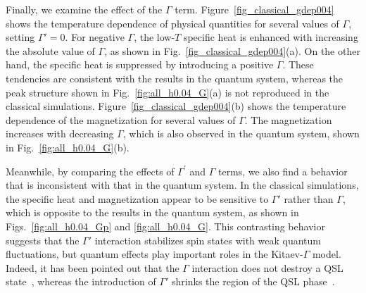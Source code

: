 \documentclass[twocolumn,superscriptaddress,showpacs, longbibliography, aps, prb]{revtex4-2}
\newcommand{\blue}[1]{\textcolor{blue}{#1}}
\newcommand{\orange}[1]{\textcolor{orange}{#1}}
\begin{document}
Finally, we %
examine the effect of the $\Gamma$ term.
Figure~\ref{fig_classical_gdep004} shows the temperature dependence of physical quantities %
for several values of $\Gamma$, %
setting $\Gamma'=0$.
For %
negative $\Gamma$, the low-$T$ specific heat is enhanced with increasing the absolute value of $\Gamma$, as shown in Fig.~\ref{fig_classical_gdep004}(a).
On the other hand, the specific heat is suppressed by %
introducing a positive $\Gamma$.
These tendencies are consistent with the results in the quantum system, %
whereas the peak structure shown in Fig.~\ref{fig:all_h0.04_G}(a) is not reproduced in the classical simulations.
Figure~\ref{fig_classical_gdep004}(b) shows the temperature dependence of the magnetization %
for several values of %
$\Gamma$.
The magnetization increases with decreasing $\Gamma$, which is also observed in the quantum 
system,
shown in Fig.~\ref{fig:all_h0.04_G}(b).

Meanwhile, %
by comparing the effects of $\Gamma^{\prime}$ and $\Gamma$ terms, 
we also find %
a behavior that is inconsistent with that in the quantum system.
In the classical simulations, the specific heat and magnetization appear to be sensitive to $\Gamma'$ rather than $\Gamma$, which is opposite to the results in the quantum system, as shown in Figs.~\ref{fig:all_h0.04_Gp} and \ref{fig:all_h0.04_G}.
This contrasting behavior suggests that the $\Gamma'$ interaction stabilizes spin states with weak quantum fluctuations, but
quantum effects play important roles in the Kitaev-$\Gamma$ model.
Indeed, it has been pointed out that the $\Gamma$ interaction does not destroy a QSL state~\cite{Gohlke2018,catuneanu2018}, whereas the introduction of $\Gamma'$ shrinks the region of the QSL phase~\cite{gordon2019theory,Luo2022}.
\end{document}
